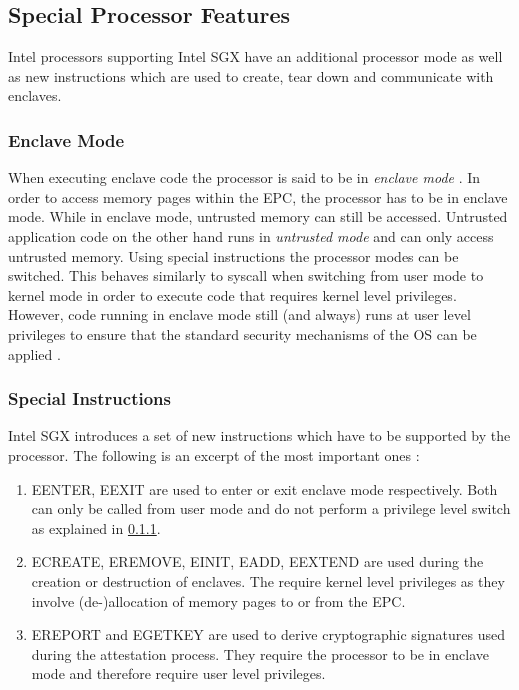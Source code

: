 \subsection{Special Processor Features}
Intel processors supporting Intel SGX have an additional processor mode as well as new instructions which are used to create, tear down and communicate with enclaves.

\subsubsection{Enclave Mode}
\label{sec:EnclaveMode}
When executing enclave code the processor is said to be in \textit{enclave mode} \cite{Costan2016IntelSE}. In order to access memory pages within the EPC, the processor has to
be in enclave mode. While in enclave mode, untrusted memory can still be accessed. Untrusted application code on the other hand runs in \textit{untrusted mode} and can only
access untrusted memory. Using special instructions the processor modes can be switched. This behaves similarly to syscall when switching from user mode to kernel mode in order
to execute code that requires kernel level privileges. However, code running in enclave mode still (and always) runs at user level privileges to ensure that the standard security
mechanisms of the OS can be applied \cite{Costan2016IntelSE}.

\subsubsection{Special Instructions}
\label{sec:Instructions}
Intel SGX introduces a set of new instructions which have to be supported by the processor. The following is an excerpt of the most important ones \cite{OverviewOfIntelSGX}:
\begin{enumerate}
    \item EENTER, EEXIT are used to enter or exit enclave mode respectively. Both can only be called from user mode and do not perform a privilege level switch as explained
          in \cref{sec:EnclaveMode}.
    \item ECREATE, EREMOVE, EINIT, EADD, EEXTEND are used during the creation or destruction of enclaves. The require kernel level privileges as they involve (de-)allocation
          of memory pages to or from the EPC.
    \item EREPORT and EGETKEY are used to derive cryptographic signatures used during the attestation process. They require the processor to be in enclave mode and therefore
          require user level privileges.
\end{enumerate}